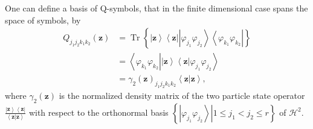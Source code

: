 \documentclass[aps,preprint]{revtex4}%
\begin{document}
One can define a basis of Q-symbols, that in the finite dimensional case spans
the space of symbols, by
\begin{align}
Q_{j_{1}j_{2}k_{1}k_{2}}\left(  \mathbf{z}\right)   &  =\operatorname*{Tr}%
\left\{  \left\vert \mathbf{z}\right\rangle \left\langle \mathbf{z}\right\vert
\left\vert \varphi_{j_{1}}\varphi_{j_{2}}\right\rangle \left\langle
\varphi_{k_{1}}\varphi_{k_{2}}\right\vert \right\} \nonumber\\
&  =\left\langle \varphi_{k_{1}}\varphi_{k_{2}}\left\vert \left\vert
\mathbf{z}\right\rangle \left\langle \mathbf{z}\right\vert \varphi_{j_{1}%
}\varphi_{j_{2}}\right.  \right\rangle \nonumber\\
&  =\gamma_{2}\left(  \mathbf{z}\right)  _{j_{1}j_{2}k_{1}k_{2}}\left\langle
\mathbf{z\left\vert \mathbf{z}\right.  }\right\rangle ,
\end{align}
where $\gamma_{2}\left(  \mathbf{z}\right)  $ is the normalized density matrix
of the two particle state operator $\frac{\left\vert \mathbf{z}\right\rangle
\left\langle \mathbf{z}\right\vert }{\left\langle \mathbf{z\left\vert
\mathbf{z}\right.  }\right\rangle }$ with respect to the orthonormal basis
$\left\{  \left.  \left\vert \varphi_{j_{1}}\varphi_{j_{2}}\right\rangle
\right\vert 1\leq j_{1}<j_{2}\leq r\right\}  $ of $\mathcal{H}^{2}.$
\end{document}
